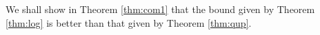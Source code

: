 

We shall show in Theorem \ref{thm:com1} that the bound given by Theorem \ref{thm:log} is better than that given by Theorem \ref{thm:qup}.








